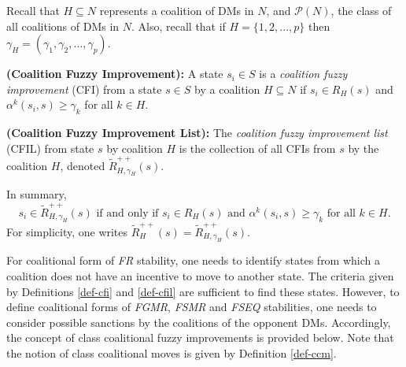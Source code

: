 Recall that $H \subseteq N$ represents a coalition of DMs in $N$, and $\mathcal{P}(N)$, the class of all coalitions of DMs in $N$. Also, recall that if $H=\{1, 2, ..., p\}$ then $\gamma_H=(\gamma_1, \gamma_2, ..., \gamma_p)$.

\begin{definition}\label{def-cfi}
\rm {\bf (Coalition Fuzzy Improvement):} A state $s_i \in S$ is a \emph{coalition fuzzy improvement} (CFI) from a state $s \in S$ by a coalition $H \subseteq N$ if $s_i \in R_H(s)$ and $\alpha^k(s_i, s) \geq \gamma_k$ for all $k \in H$.
\end{definition}

\begin{definition}\label{def-cfil}
\rm  {\bf (Coalition Fuzzy Improvement List):} The \emph{coalition fuzzy improvement list} (CFIL) from state $s$ by coalition $H$ is the collection of all CFIs from $s$ by the coalition $H$, denoted $\widetilde{R}_{H, \gamma_H}^{++}(s)$.
\end{definition}

\noindent In summary,
$$s_i \in \widetilde{R}_{H, \gamma_H}^{++}(s) \text{ if and only if } s_i \in R_H(s) \text{ and } \alpha^k(s_i, s) \geq \gamma_k \text{ for all } k \in H.$$
For simplicity, one writes $\widetilde{R}_H^{++}(s)=\widetilde{R}_{H, \gamma_H}^{++}(s)$.

For coalitional form of \emph{FR} stability, one needs to identify states from which a coalition does not have an incentive to move to another state. The criteria given by Definitions \ref{def-cfi} and \ref{def-cfil} are sufficient to find these states. However, to define coalitional forms of \emph{FGMR}, \emph{FSMR} and \emph{FSEQ} stabilities, one needs to consider possible sanctions by the coalitions of the opponent DMs. Accordingly, the concept of class coalitional fuzzy improvements is provided below. Note that the notion of class coalitional moves is given by Definition \ref{def-ccm}.

